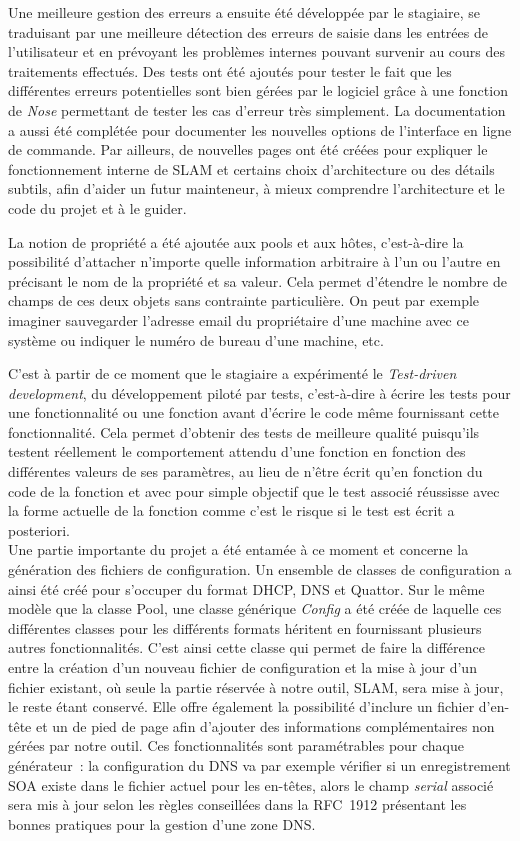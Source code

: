 \documentclass[12pt,a4paper,twoside]{report}
\begin{document}
Une meilleure gestion des erreurs a ensuite été développée par le stagiaire, se
traduisant par une meilleure détection des erreurs de saisie dans les entrées
de l’utilisateur et en prévoyant les problèmes internes pouvant survenir au
cours des traitements effectués. Des tests ont été ajoutés pour tester le fait
que les différentes erreurs potentielles sont bien gérées par le logiciel grâce
à une fonction de \emph{Nose} permettant de tester les cas d’erreur très
simplement.  La documentation a aussi été complétée pour documenter les
nouvelles options de l’interface en ligne de commande. Par ailleurs, de
nouvelles pages ont été créées pour expliquer le fonctionnement interne de SLAM
et certains choix d’architecture ou des détails subtils, afin d’aider un futur
mainteneur, à mieux comprendre l’architecture et le code du projet et à le
guider.

La notion de propriété a été ajoutée aux pools et aux hôtes, c'est-à-dire la
possibilité d’attacher n’importe quelle information arbitraire à l’un ou
l’autre en précisant le nom de la propriété et sa valeur. Cela permet
d’étendre le nombre de champs de ces deux objets sans contrainte particulière.
On peut par exemple imaginer sauvegarder l’adresse email du propriétaire d’une
machine avec ce système ou indiquer le numéro de bureau d’une machine, etc.
\label{sec:property}

C’est à partir de ce moment que le stagiaire a expérimenté le \emph{Test-driven
development}, du développement piloté par tests, c'est-à-dire à écrire les
tests pour une fonctionnalité ou une fonction avant d’écrire le code même
fournissant cette fonctionnalité. Cela permet d’obtenir des tests de meilleure
qualité puisqu’ils testent réellement le comportement attendu d’une fonction
en fonction des différentes valeurs de ses paramètres, au lieu de n’être écrit
qu’en fonction du code de la fonction et avec pour simple objectif que le test
associé réussisse avec la forme actuelle de la fonction comme c’est le risque
si le test est écrit a posteriori.\\

Une partie importante du projet a été entamée à ce moment et concerne la
génération des fichiers de configuration. Un ensemble de classes de
configuration a ainsi été créé pour s’occuper du format DHCP, DNS et Quattor.
Sur le même modèle que la classe Pool, une classe générique \emph{Config} a été
créée de laquelle ces différentes classes pour les différents formats
héritent en fournissant plusieurs autres fonctionnalités. C’est ainsi cette
classe qui permet de faire la différence entre la création d’un nouveau fichier
de configuration et la mise à jour d’un fichier existant, où seule la partie
réservée à notre outil, SLAM, sera mise à jour, le reste étant conservé. Elle
offre également la possibilité d’inclure un fichier d’en-tête et un de
pied de page afin d’ajouter des informations complémentaires non gérées par
notre outil. Ces fonctionnalités sont paramétrables pour chaque générateur~: la
configuration du DNS va par exemple vérifier si un enregistrement SOA existe
dans le fichier actuel pour les en-têtes, alors le champ \emph{serial} associé
sera mis à jour selon les règles conseillées dans la RFC~1912 présentant les
bonnes pratiques pour la gestion d’une zone DNS.
\end{document}
